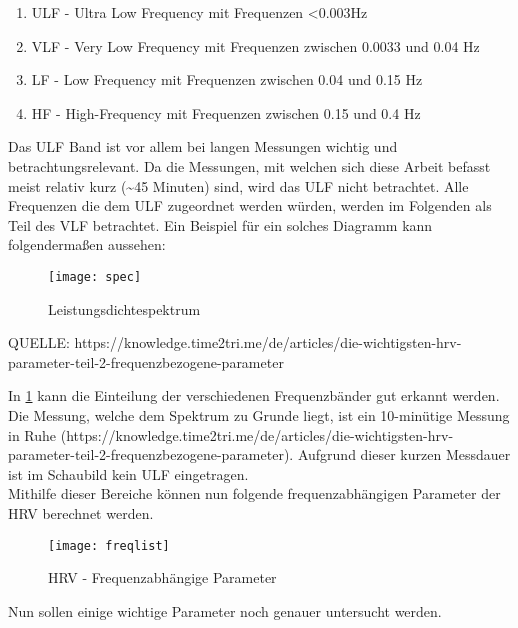  \begin{enumerate}
 	\item ULF - Ultra Low Frequency mit Frequenzen <0.003Hz
 	\item VLF - Very Low Frequency mit Frequenzen zwischen 0.0033 und 0.04 Hz
 	\item LF - Low Frequency mit Frequenzen zwischen 0.04 und 0.15 Hz
 	\item HF - High-Frequency mit Frequenzen zwischen 0.15 und 0.4 Hz
 \end{enumerate}
 
 Das ULF Band ist vor allem bei langen Messungen wichtig und betrachtungsrelevant. Da die Messungen, mit welchen sich diese Arbeit befasst meist relativ kurz (\textasciitilde 45 Minuten) sind, wird das ULF nicht betrachtet. Alle Frequenzen die dem ULF zugeordnet werden würden, werden im Folgenden als Teil des VLF betrachtet. Ein Beispiel für ein solches Diagramm kann folgendermaßen aussehen:
 
 \begin{figure}[H]
 	\centering
 	\texttt{[image: spec]}
 	\caption{Leistungsdichtespektrum}
 	\label{fig:spec}
 \end{figure}
 QUELLE: https://knowledge.time2tri.me/de/articles/die-wichtigsten-hrv-parameter-teil-2-frequenzbezogene-parameter
 
 In \ref{fig:spec} kann die Einteilung der verschiedenen Frequenzbänder gut erkannt werden. Die Messung, welche dem Spektrum zu Grunde liegt, ist ein 10-minütige Messung in Ruhe (https://knowledge.time2tri.me/de/articles/die-wichtigsten-hrv-parameter-teil-2-frequenzbezogene-parameter). Aufgrund dieser kurzen Messdauer ist im Schaubild kein ULF eingetragen. \\
 
 Mithilfe dieser Bereiche können nun folgende frequenzabhängigen Parameter der HRV berechnet werden. 
 \begin{figure}[H]
 	\centering
 	\texttt{[image: freqlist]}
 	\caption{HRV - Frequenzabhängige Parameter}
 	\label{fig:freqpic}
 \end{figure}
 Nun sollen einige wichtige Parameter noch genauer untersucht werden.
 

